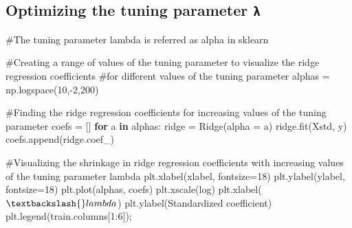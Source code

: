 \documentclass[
  letterpaper,
  DIV=11,
  numbers=noendperiod]{scrreprt}
\newenvironment{Shaded}{\begin{snugshade}}{\end{snugshade}}
\newcommand{\CommentTok}[1]{\textcolor[rgb]{0.37,0.37,0.37}{#1}}
\newcommand{\ControlFlowTok}[1]{\textcolor[rgb]{0.00,0.23,0.31}{\textbf{#1}}}
\newcommand{\DecValTok}[1]{\textcolor[rgb]{0.68,0.00,0.00}{#1}}
\newcommand{\KeywordTok}[1]{\textcolor[rgb]{0.00,0.23,0.31}{\textbf{#1}}}
\newcommand{\NormalTok}[1]{\textcolor[rgb]{0.00,0.23,0.31}{#1}}
\newcommand{\OperatorTok}[1]{\textcolor[rgb]{0.37,0.37,0.37}{#1}}
\newcommand{\StringTok}[1]{\textcolor[rgb]{0.13,0.47,0.30}{#1}}
\begin{document}
\subsection{\texorpdfstring{Optimizing the tuning parameter
\texttt{λ}}{Optimizing the tuning parameter λ}}\label{optimizing-the-tuning-parameter-ux3bb}

\begin{Shaded}
\begin{Highlighting}[]
\CommentTok{\#The tuning parameter lambda is referred as alpha in sklearn}

\CommentTok{\#Creating a range of values of the tuning parameter to visualize the ridge regression coefficients}
\CommentTok{\#for different values of the tuning parameter}
\NormalTok{alphas }\OperatorTok{=}\NormalTok{ np.logspace(}\DecValTok{10}\NormalTok{,}\OperatorTok{{-}}\DecValTok{2}\NormalTok{,}\DecValTok{200}\NormalTok{)}
\end{Highlighting}
\end{Shaded}

\begin{Shaded}
\begin{Highlighting}[]
\CommentTok{\#Finding the ridge regression coefficients for increasing values of the tuning parameter}
\NormalTok{coefs }\OperatorTok{=}\NormalTok{ []}
\ControlFlowTok{for}\NormalTok{ a }\KeywordTok{in}\NormalTok{ alphas:        }
\NormalTok{    ridge }\OperatorTok{=}\NormalTok{ Ridge(alpha }\OperatorTok{=}\NormalTok{ a)}
\NormalTok{    ridge.fit(Xstd, y)}
\NormalTok{    coefs.append(ridge.coef\_)}
\end{Highlighting}
\end{Shaded}

\begin{Shaded}
\begin{Highlighting}[]
\CommentTok{\#Visualizing the shrinkage in ridge regression coefficients with increasing values of the tuning parameter lambda}
\NormalTok{plt.xlabel(}\StringTok{\textquotesingle{}xlabel\textquotesingle{}}\NormalTok{, fontsize}\OperatorTok{=}\DecValTok{18}\NormalTok{)}
\NormalTok{plt.ylabel(}\StringTok{\textquotesingle{}ylabel\textquotesingle{}}\NormalTok{, fontsize}\OperatorTok{=}\DecValTok{18}\NormalTok{)}
\NormalTok{plt.plot(alphas, coefs)}
\NormalTok{plt.xscale(}\StringTok{\textquotesingle{}log\textquotesingle{}}\NormalTok{)}
\NormalTok{plt.xlabel(}\StringTok{\textquotesingle{}$\textbackslash{}lambda$\textquotesingle{}}\NormalTok{)}
\NormalTok{plt.ylabel(}\StringTok{\textquotesingle{}Standardized coefficient\textquotesingle{}}\NormalTok{)}
\NormalTok{plt.legend(train.columns[}\DecValTok{1}\NormalTok{:}\DecValTok{6}\NormalTok{])}\OperatorTok{;}
\end{Highlighting}
\end{Shaded}
\end{document}
